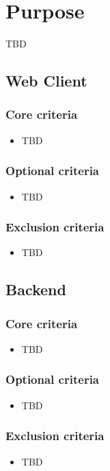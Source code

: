 \section{Purpose}
TBD

\subsection{Web Client}
\subsubsection{Core criteria}
\begin{itemize}
\item TBD
\end{itemize}

\subsubsection{Optional criteria}
\begin{itemize}
\item TBD
\end{itemize}

\subsubsection{Exclusion criteria}
\begin{itemize}
\item TBD
\end{itemize}


\subsection{Backend}
\subsubsection{Core criteria}
\begin{itemize}
\item TBD
\end{itemize}

\subsubsection{Optional criteria}
\begin{itemize}
\item TBD
\end{itemize}

\subsubsection{Exclusion criteria}
\begin{itemize}
\item TBD
\end{itemize}
